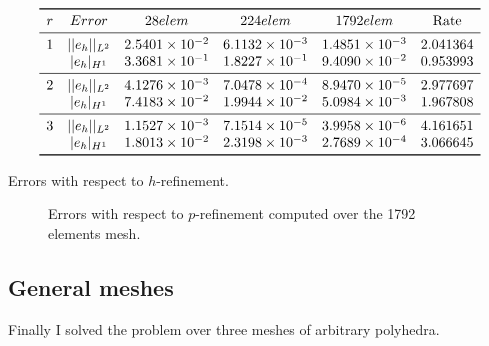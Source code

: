 \documentclass[12pt, a4paper]{article}
\begin{document}
\begin{table}[h]
	\centering
	\[
	\begin{array}{cccccc}
	\toprule
	r & Error & 28 elem & 224 elem & 1792 elem & \text{Rate} \\ 
	\midrule
	1 & ||e_{h}||_{L^2} & 2.5401 \times 10^{-2} & 6.1132 \times 10^{-3} & 1.4851 \times 10^{-3} & 2.041364\\
	  & |e_{h}|_{H^1}   & 3.3681 \times 10^{-1} & 1.8227 \times 10^{-1} & 9.4090 \times 10^{-2} & 0.953993\\
	\midrule
	2 & ||e_{h}||_{L^2} & 4.1276 \times 10^{-3} & 7.0478 \times 10^{-4} & 8.9470 \times 10^{-5} & 2.977697\\
	  & |e_{h}|_{H^1}   & 7.4183 \times 10^{-2} & 1.9944 \times 10^{-2} & 5.0984 \times 10^{-3} & 1.967808\\
	\midrule
	3 & ||e_{h}||_{L^2} & 1.1527 \times 10^{-3} & 7.1514 \times 10^{-5} & 3.9958 \times 10^{-6} & 4.161651\\
	  & |e_{h}|_{H^1}   & 1.8013 \times 10^{-2} & 2.3198 \times 10^{-3} & 2.7689 \times 10^{-4} & 3.066645\\
	\bottomrule
	\end{array}
	\]
	\caption{Errors with respect to $h$-refinement.}
\end{table}

\begin{figure}[h!]
	\centering
	\caption{Errors with respect to $p$-refinement computed over the 1792 elements mesh.}
\end{figure}

\subsection{General meshes}
Finally I solved the problem over three meshes of arbitrary polyhedra.
\end{document}
